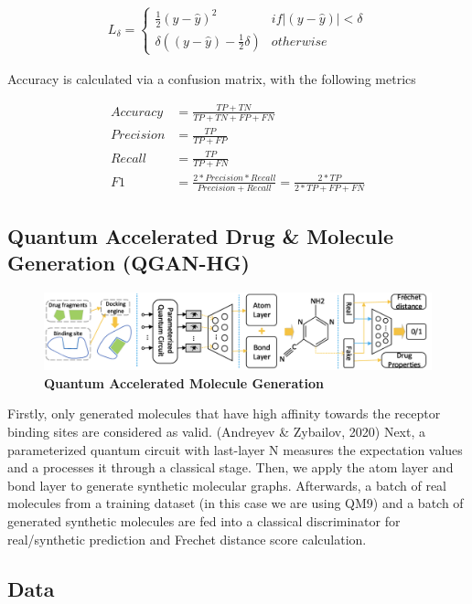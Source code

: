 \documentclass{scrartcl}
\makeatletter
\newcommand{\citeprocitem}[2]{\hyper@linkstart{cite}{citeproc_bib_item_#1}#2\hyper@linkend}
\makeatother
\begin{document}
\begin{align}
L_{\delta}=
    \left\{\begin{matrix}
        \frac{1}{2}(y - \hat{y})^{2} & if \left | (y - \hat{y})  \right | < \delta\\
        \delta ((y - \hat{y}) - \frac1 2 \delta) & otherwise
    \end{matrix}\right.
\end{align}

Accuracy is calculated via a confusion matrix, with the following metrics

\begin{align}
Accuracy &= \frac{TP+TN}{TP+TN+FP+FN}\\
Precision &= \frac{TP}{TP+FP}\\
Recall &= \frac{TP}{TP+FN}\\
F1 &= \frac{2*Precision*Recall}{Precision+Recall} = \frac{2*TP}{2*TP+FP+FN}
\end{align}

\subsection{Quantum Accelerated Drug \& Molecule Generation (QGAN-HG)}
\label{sec:org15b0e26}

\begin{figure}[htbp]
\centering
\includegraphics[width=.9\linewidth]{./assets/quganflow.png}
\caption{\textbf{Quantum Accelerated Molecule Generation}}
\end{figure}

Firstly, only generated molecules that have high affinity towards the receptor binding sites are considered as valid. (\citeprocitem{1}{Andreyev \& Zybailov, 2020}) Next, a parameterized quantum circuit with last-layer N measures the expectation values and a processes it through a classical stage. Then, we apply the atom layer and bond layer to generate synthetic molecular graphs. Afterwards, a batch of real molecules from a training dataset (in this case we are using QM9) and a batch of generated synthetic molecules are fed into a classical discriminator for real/synthetic prediction and Frechet distance score calculation.

\subsection{Data}
\label{sec:orgc7a20ea}
\end{document}
